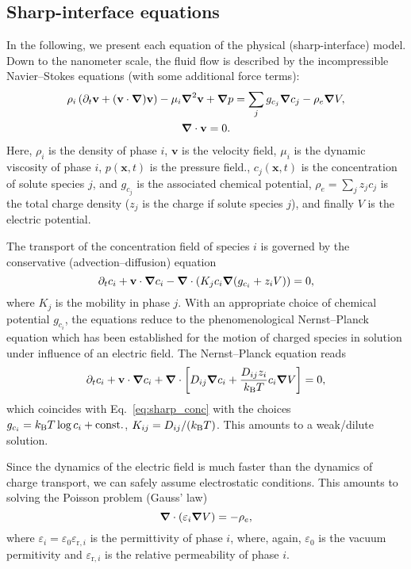 \documentclass[preprint,pre,superscriptaddress,a4paper]{revtex4-1}
\renewcommand{\v}[1]{\ensuremath{\mathbf{#1}}} %
\newcommand{\gv}[1]{\ensuremath{\mbox{\boldmath$ #1 $}}}
\newcommand{\grad}[1]{\gv{\nabla} #1} %
\renewcommand{\div}[1]{\gv{\nabla} \cdot #1} %
\newcommand{\laplacian}[1]{\grad^2 #1}
\newcommand{\pdt}[1]{\partial_t #1}
\begin{document}
\subsection{Sharp-interface equations}
In the following, we present each equation of the physical (sharp-interface) model.
Down to the nanometer scale, the fluid flow is described by the incompressible Navier--Stokes equations (with some additional force terms):
\begin{gather}
  \rho_i \left( \pdt {\v v} + (\v v \cdot \grad ) \v v \right)  - \mu_i \laplacian \v v + \grad p = \sum_j g_{c_j} \grad c_j - \rho_e \grad V, \label{eq:sharp_NS1}\\
  \div \v v = 0. \label{eq:sharp_NS2}
\end{gather}
Here, $\rho_i$ is the density of phase $i$, $\v v$ is the velocity field, $\mu_i$ is the dynamic viscosity of phase $i$, $p(\v x, t)$ is the pressure field., $c_j (\v x, t)$ is the concentration of solute species $j$, and $g_{c_j}$ is the associated chemical potential, $ \rho_e = \sum_j z_j c_j$ is the total charge density ($z_j$ is the charge if solute species $j$), and finally $V$ is the electric potential.

The transport of the concentration field of species $i$ is governed by the conservative (advection--diffusion) equation
\begin{equation}
  \pdt c_i + \v v \cdot \grad c_i - \div (K_{j} c_i \grad (g_{c_i} + z_i V)) = 0,
  \label{eq:sharp_conc}
\end{equation}
where $K_{j}$ is the mobility in phase $j$.
With an appropriate choice of chemical potential $g_{c_i}$, the equations reduce to the phenomenological Nernst--Planck equation which has been established for the motion of charged species in solution under influence of an electric field. The Nernst--Planck equation reads
\begin{equation}
  \pdt c_i + \v v \cdot \grad c_i + \div \left[ D_{ij} \grad c_i + \frac{D_{ij} z_i}{k_{\rm B} T} c_i \grad V \right] = 0,
  \label{eq:nernst-planck}
\end{equation}
which coincides with Eq.~\eqref{eq:sharp_conc} with the choices $g_{c_i} = k_{\rm B} T \log c_i + \textrm{const.}$, $K_{ij} = D_{ij}/(k_{\rm B} T)$.
This amounts to a weak/dilute solution.

Since the dynamics of the electric field is much faster than the dynamics of charge transport, we can safely assume electrostatic conditions.
This amounts to solving the Poisson problem (Gauss' law)
\begin{equation}
  \div ( \varepsilon_i \grad V ) = - \rho_e,
\end{equation}
where $\varepsilon_i = \varepsilon_0 \varepsilon_{\textrm{r}, i}$ is the permittivity of phase $i$, where, again, $\varepsilon_0$ is the vacuum permitivity and $\varepsilon_{\textrm{r}, i}$ is the relative permeability of phase $i$. 
\end{document}
